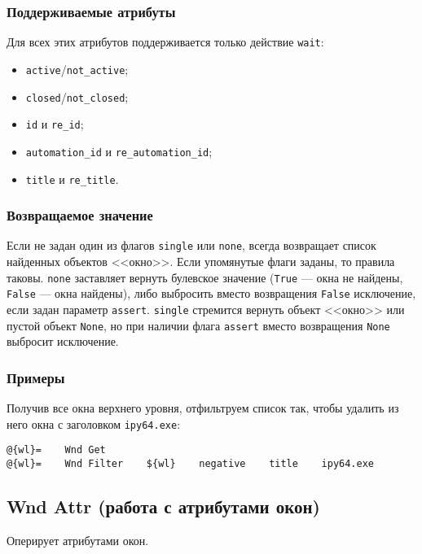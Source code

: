 \documentclass[11pt]{book} %
\begin{document}
\subsubsection*{Поддерживаемые атрибуты} 

Для всех этих атрибутов поддерживается только действие \verb|wait|:

\begin{itemize}
	\item \verb"active"/\verb"not_active";
	\item \verb"closed"/\verb"not_closed";
	\item \verb"id" и \verb"re_id";
	\item \verb"automation_id" и \verb"re_automation_id";
	\item \verb"title" и \verb"re_title".
\end{itemize}



\subsubsection*{Возвращаемое значение}
Если не задан один из флагов \verb"single" или \verb"none", всегда возвращает список найденных объектов <<окно>>. Если упомянутые флаги заданы, то правила таковы. \verb"none" заставляет вернуть булевское значение (\verb"True" --- окна не найдены, \verb"False" --- окна найдены), либо выбросить вместо возвращения \verb"False" исключение, если задан параметр \verb"assert". \verb"single" стремится вернуть объект <<окно>> или пустой объект \verb"None", но при наличии флага \verb"assert" вместо возвращения \verb"None" выбросит исключение.



\subsubsection*{Примеры}
Получив все окна верхнего уровня, отфильтруем список так, чтобы удалить из него окна с заголовком \verb"ipy64.exe":

\begin{verbatim}
@{wl}=    Wnd Get
@{wl}=    Wnd Filter    ${wl}    negative    title    ipy64.exe
\end{verbatim}


\subsection{Wnd Attr (работа с атрибутами окон)}
Оперирует атрибутами окон.
\end{document}
